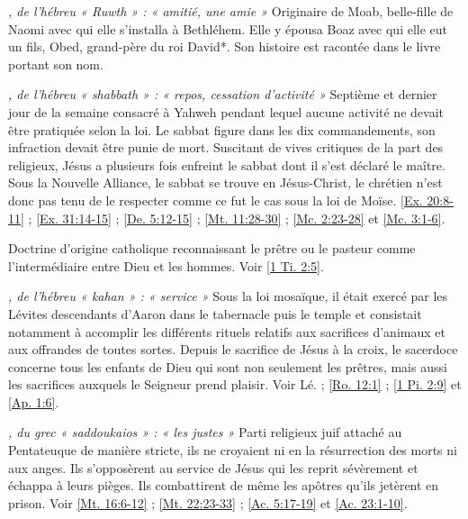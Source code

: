 \begin{multicols}{2}
\textit{, de l'hébreu « Ruwth » : « amitié, une amie »}\newline
Originaire de Moab, belle-fille de Naomi avec qui elle s'installa à Bethléhem. Elle y épousa Boaz avec qui elle eut un fils, Obed, grand-père du roi David*. Son histoire est racontée dans le livre portant son nom.

\textit{, de l'hébreu « shabbath » : « repos, cessation d'activité »}\newline
Septième et dernier jour de la semaine consacré à Yahweh pendant lequel aucune activité ne devait être pratiquée selon la loi. Le sabbat figure dans les dix commandements, son infraction devait être punie de mort. Suscitant de vives critiques de la part des religieux, Jésus a plusieurs fois enfreint le sabbat dont il s'est déclaré le maître. Sous la Nouvelle Alliance, le sabbat se trouve en Jésus-Christ, le chrétien n'est donc pas tenu de le respecter comme ce fut le cas sous la loi de Moïse. \vref{Ex. 20:8-11} ; \vref{Ex. 31:14-15} ; \vref{De. 5:12-15} ; \vref{Mt. 11:28-30} ; \vref{Mc. 2:23-28} et \vref{Mc. 3:1-6}.

\textit{}\newline
Doctrine d'origine catholique reconnaissant le prêtre ou le pasteur comme l'intermédiaire entre Dieu et les hommes. Voir \vref{1 Ti. 2:5}.

\textit{, de l'hébreu « kahan » : « service »}\newline
Sous la loi mosaïque, il était exercé par les Lévites descendants d'Aaron dans le tabernacle puis le temple et consistait notamment à accomplir les différents rituels relatifs aux sacrifices d'animaux et aux offrandes de toutes sortes. Depuis le sacrifice de Jésus à la croix, le sacerdoce concerne tous les enfants de Dieu qui sont non seulement les prêtres, mais aussi les sacrifices auxquels le Seigneur prend plaisir. Voir Lé. ; \vref{Ro. 12:1} ; \vref{1 Pi. 2:9} et \vref{Ap. 1:6}.

\textit{, du grec « saddoukaios » : « les justes »}\newline
Parti religieux juif attaché au Pentateuque de manière stricte, ils ne croyaient ni en la résurrection des morts ni aux anges. Ils s'opposèrent au service de Jésus qui les reprit sévèrement et échappa à leurs pièges. Ils combattirent de même les apôtres qu'ils jetèrent en prison. Voir \vref{Mt. 16:6-12} ; \vref{Mt. 22:23-33} ; \vref{Ac. 5:17-19} et \vref{Ac. 23:1-10}.


\end{multicols}
